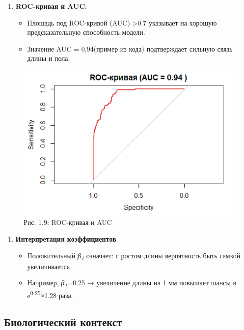 \documentclass[
  letterpaper,
  DIV=11,
  numbers=noendperiod]{scrreprt}
\begin{document}
\begin{enumerate}
\def\labelenumi{\arabic{enumi}.}
\item
  \textbf{ROC-кривая и AUC}:

  \begin{itemize}
  \item
    Площадь под ROC-кривой (AUC) \textgreater0.7 указывает на хорошую
    предсказательную способность модели.
  \item
    Значение AUC = 0.94(пример из кода) подтверждает сильную связь длины
    и пола.
  \end{itemize}
\end{enumerate}

\begin{figure}[H]

{\centering \includegraphics[width=0.6\linewidth,height=\textheight,keepaspectratio]{images/ROC_shrimp.PNG}

}

\caption{Рис. 1.9: ROC-кривая и AUC}

\end{figure}%

\begin{enumerate}
\def\labelenumi{\arabic{enumi}.}
\setcounter{enumi}{1}
\item
  \textbf{Интерпретация коэффициентов}:

  \begin{itemize}
  \item
    Положительный \emph{β\textsubscript{1}} означает: с ростом длины
    вероятность быть самкой увеличивается.
  \item
    Например, \emph{β\textsubscript{1}}=0.25 → увеличение длины на 1 мм
    повышает шансы в e\textsuperscript{0.25}≈1.28 раза.
  \end{itemize}
\end{enumerate}

\subsection{\texorpdfstring{\textbf{Биологический
контекст}}{Биологический контекст}}\label{ux431ux438ux43eux43bux43eux433ux438ux447ux435ux441ux43aux438ux439-ux43aux43eux43dux442ux435ux43aux441ux442}
\end{document}
